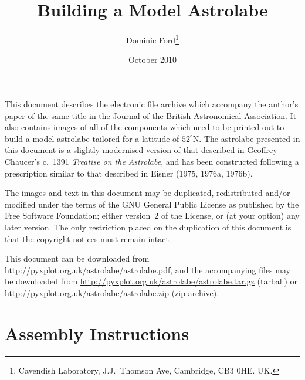 \documentclass[a4paper,onecolumn,10pt]{article}
\title{Building a Model Astrolabe}
\author{Dominic Ford\footnote{Cavendish Laboratory, J.J.\ Thomson Ave, Cambridge, CB3 0HE. UK.}}
\date{October 2010}
\begin{document}
\maketitle
\setcounter{footnote}{1}

This document describes the electronic file archive which accompany the
author's paper of the same title in the Journal of the British Astronomical
Association.  It also contains images of all of the components which need to be
printed out to build a model astrolabe tailored for a latitude of $52^\circ$N.
The astrolabe presented in this document is a slightly modernised version of
that described in Geoffrey Chaucer's c.\ 1391 {\it Treatise on the Astrolabe},
and has been constructed following a prescription similar to that described in
Eisner (1975, 1976a, 1976b).

The images and text in this document may be duplicated, redistributed and/or
modified under the terms of the GNU General Public License as published by the
Free Software Foundation; either version~2 of the License, or (at your option)
any later version. The only restriction placed on the duplication of this
document is that the copyright notices must remain intact.

This document can be downloaded from
\vspace{1mm}\newline\noindent
\url{http://pyxplot.org.uk/astrolabe/astrolabe.pdf},
\vspace{1mm}\newline\noindent
and the accompanying files may be downloaded from
\vspace{1mm}\newline\noindent
\url{http://pyxplot.org.uk/astrolabe/astrolabe.tar.gz} (tarball)
\vspace{1mm}\newline\noindent
or
\vspace{1mm}\newline\noindent
\url{http://pyxplot.org.uk/astrolabe/astrolabe.zip} (zip archive).

\section*{Assembly Instructions}
\end{document}
